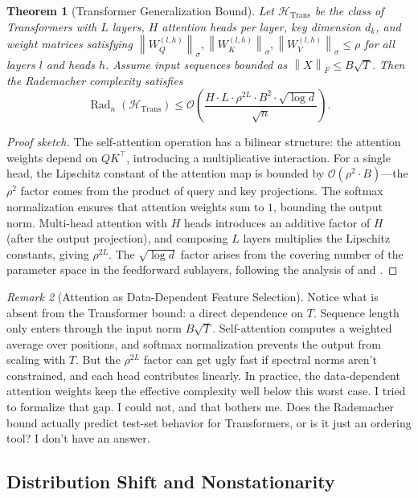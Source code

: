 \documentclass[11pt]{article}
\newtheorem{theorem}{Theorem}[section]
\theoremstyle{definition}
\theoremstyle{remark}
\newtheorem{remark}[theorem]{Remark}
\newcommand{\cH}{\mathcal{H}}
\newcommand{\cO}{\mathcal{O}}
\DeclareMathOperator{\Rad}{Rad}
\newcommand{\norm}[1]{\left\lVert #1 \right\rVert}
\begin{document}
\begin{theorem}[Transformer Generalization Bound]\label{thm:transformer_bound}
Let $\cH_{\mathrm{Trans}}$ be the class of Transformers with $L$ layers, $H$ attention heads per layer, key dimension $d_k$, and weight matrices satisfying $\norm{W_Q^{(l,h)}}_\sigma, \norm{W_K^{(l,h)}}_\sigma, \norm{W_V^{(l,h)}}_\sigma \leq \rho$ for all layers $l$ and heads $h$.
Assume input sequences bounded as $\norm{X}_F \leq B\sqrt{T}$.
Then the Rademacher complexity satisfies
\[
    \Rad_n(\cH_{\mathrm{Trans}}) \leq \cO\!\left( \frac{H \cdot L \cdot \rho^{2L} \cdot B^2 \cdot \sqrt{\log d}}{\sqrt{n}} \right).
\]
\end{theorem}

\begin{proof}[Proof sketch]
The self-attention operation has a bilinear structure: the attention weights depend on $QK^\top$, introducing a multiplicative interaction.
For a single head, the Lipschitz constant of the attention map is bounded by $\cO(\rho^2 \cdot B)$---the $\rho^2$ factor comes from the product of query and key projections.
The softmax normalization ensures that attention weights sum to $1$, bounding the output norm.
Multi-head attention with $H$ heads introduces an additive factor of $H$ (after the output projection), and composing $L$ layers multiplies the Lipschitz constants, giving $\rho^{2L}$.
The $\sqrt{\log d}$ factor arises from the covering number of the parameter space in the feedforward sublayers, following the analysis of \citet{bartlett2017spectrally} and \citet{neyshabur2015norm}.
\end{proof}

\begin{remark}[Attention as Data-Dependent Feature Selection]
Notice what is absent from the Transformer bound: a direct dependence on $T$.
Sequence length only enters through the input norm $B\sqrt{T}$.
Self-attention computes a weighted average over positions, and softmax normalization prevents the output from scaling with $T$.
But the $\rho^{2L}$ factor can get ugly fast if spectral norms aren't constrained, and each head contributes linearly.
In practice, the data-dependent attention weights keep the effective complexity well below this worst case.
I tried to formalize that gap.
I could not, and that bothers me.
Does the Rademacher bound actually predict test-set behavior for Transformers, or is it just an ordering tool?
I don't have an answer.
\end{remark}


\subsection{Distribution Shift and Nonstationarity}\label{sec:theory:shift}
\end{document}
